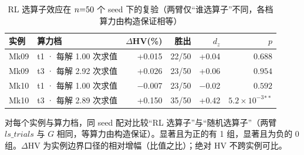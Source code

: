 \begin{table}[htbp]
  \centering
  \caption{RL 选算子效应在 $n{=}50$ 个 seed 下的复验（两臂仅“谁选算子”不同，各档算力由构造保证相等）}
  \label{tab:rl50}
  \small
  \begin{tabular}{llrrrr}
    \toprule
    实例 & 算力档 & $\Delta$HV(\%) & 胜出 & $d_z$ & $p$ \\
    \midrule
    Mk09 & t1 · 每解 1.00 次求值 & +0.015 & 22/50 & +0.04 & $0.688$ \\
    Mk09 & t3 · 每解 2.92 次求值 & +0.026 & 23/50 & +0.06 & $0.954$ \\
    Mk10 & t1 · 每解 1.00 次求值 & −0.007 & 23/50 & −0.02 & $0.592$ \\
    Mk10 & t3 · 每解 2.89 次求值 & +0.150 & 35/50 & +0.42 & $5.2\times 10^{-3}{}^{**}$ \\
    \bottomrule
  \end{tabular}
  \par\vspace{3pt}\footnotesize\begin{minipage}{\linewidth}对每个实例与算力档，同 seed 配对比较“RL 选算子”与“随机选算子”（两臂 $ls\_trials$ 与 $G$ 相同，等算力由构造保证）。显著且为正的有 1 组，显著且为负的 0 组。$\Delta$HV 为实例边界口径的相对增幅（比值之比）；绝对 HV 不跨实例可比。\end{minipage}
\end{table}
